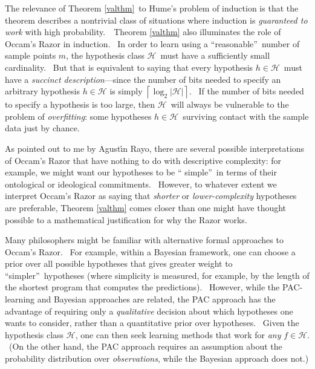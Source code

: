 \documentclass[11pt,onecolumn]{article}%
\begin{document}
The relevance of Theorem \ref{valthm}\ to Hume's problem of induction is that
the theorem describes a nontrivial class of situations where induction is
\textit{guaranteed to work} with high probability.\ \ Theorem \ref{valthm}
also illuminates the role of Occam's Razor in induction. \ In order to learn
using a \textquotedblleft reasonable\textquotedblright\ number of sample
points $m$, the hypothesis class $\mathcal{H}$\ must have a sufficiently small
cardinality. \ But that is equivalent to saying that every hypothesis
$h\in\mathcal{H}$\ must have a \textit{succinct description}---since the
number of bits needed to specify an arbitrary hypothesis $h\in\mathcal{H}$ is
simply $\left\lceil \log_{2}\left\vert \mathcal{H}\right\vert \right\rceil $.
\ If the number of bits needed to specify a hypothesis is too large, then
$\mathcal{H}$\ will always be vulnerable to the problem of
\textit{overfitting}: some hypotheses $h\in\mathcal{H}$\ surviving contact
with the sample data just by chance.

As pointed out to me by Agust\'{\i}n Rayo, there are several possible
interpretations of Occam's Razor that have nothing to do with descriptive
complexity: for example, we might want our hypotheses to be \textquotedblleft
simple\textquotedblright\ in terms of their ontological or ideological
commitments. \ However, to whatever extent we interpret Occam's Razor as
saying that \textit{shorter} or \textit{lower-complexity} hypotheses are
preferable, Theorem \ref{valthm} comes closer than one might have thought
possible to a mathematical justification for why the Razor works.

Many philosophers might be familiar with alternative formal approaches to
Occam's Razor. \ For example, within a Bayesian framework, one can choose a
prior over all possible hypotheses that gives greater weight to
\textquotedblleft simpler\textquotedblright\ hypotheses (where simplicity is
measured, for example, by the length of the shortest program that computes the
predictions). \ However, while the PAC-learning and Bayesian approaches are
related, the PAC approach has the advantage of requiring only a
\textit{qualitative} decision about which hypotheses one wants to consider,
rather than a quantitative prior over hypotheses. \ Given the hypothesis class
$\mathcal{H}$, one can then seek learning methods that work for \textit{any}
$f\in\mathcal{H}$. \ (On the other hand, the PAC approach requires an
assumption about the probability distribution over \textit{observations},
while the Bayesian approach does not.)
\end{document}

